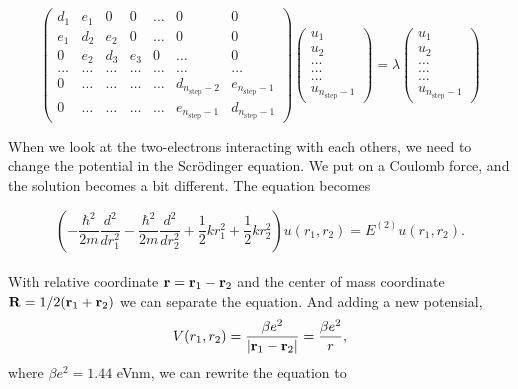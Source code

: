 \documentclass[a4paper,12pt, english]{article}
\begin{document}
\begin{equation}
    \left( \begin{array}{ccccccc} d_1 & e_1 & 0   & 0    & \dots  &0     & 0 \\
                                e_1 & d_2 & e_2 & 0    & \dots  &0     &0 \\
                                0   & e_2 & d_3 & e_3  &0       &\dots & 0\\
                                \dots  & \dots & \dots & \dots  &\dots      &\dots & \dots\\
                                0   & \dots & \dots & \dots  &\dots       &d_{n_{\mathrm{step}}-2} & e_{n_{\mathrm{step}}-1}\\
                                0   & \dots & \dots & \dots  &\dots       &e_{n_{\mathrm{step}}-1} & d_{n_{\mathrm{step}}-1}

             \end{array} \right)      \left( \begin{array}{c} u_{1} \\
                                                              u_{2} \\
                                                              \dots\\ \dots\\ \dots\\
                                                              u_{n_{\mathrm{step}}-1}
             \end{array} \right)=\lambda \left( \begin{array}{c} u_{1} \\
                                                              u_{2} \\
                                                              \dots\\ \dots\\ \dots\\
                                                              u_{n_{\mathrm{step}}-1}
             \end{array} \right) 
      \label{eq:sematrix}
\end{equation} 

When we look at the two-electrons interacting with each others, we need to change the potential in the Scr\"odinger equation. We put on a Coulomb force, and the solution becomes a bit different. 
The equation becomes 

$$\left(  -\frac{\hbar^2}{2 m} \frac{d^2}{dr_1^2} -\frac{\hbar^2}{2 m} \frac{d^2}{dr_2^2}+ \frac{1}{2}k r_1^2+ \frac{1}{2}k r_2^2\right)u(r_1,r_2)  = E^{(2)} u(r_1,r_2) .$$
\\
With relative coordinate ${\bf r} = {\bf r}_1-{\bf r}_2$ and the center of mass coordinate ${\bf R} = 1/2({\bf r}_1+{\bf r}_2)$ we can separate the equation. And adding a new potensial, $$V(r_1,r_2) = \frac{\beta e^2}{|{\bf r}_1-{\bf r}_2|}=\frac{\beta e^2}{r},$$ where $\beta e^2=1.44$ eVnm, we can rewrite the equation to
\end{document}
